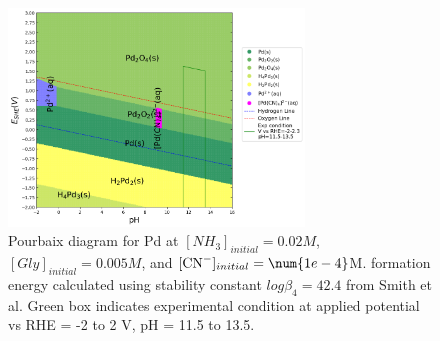 \documentclass[journal=jacsat,manuscript=article,email=false]{achemso}
\begin{document}

\begin{figure}[htbp]
    \centering
    \includegraphics[width=0.7\textwidth]{Figures/pourbaix_diagrams/Pd-NH3-H2O_activity_Smith1989CriticalConstants_Pd_42.4=1e-04_[NH3]=0.02M_[Gly]=0.005M_[CN]=0.0001.png}
    \caption{Pourbaix diagram for Pd at $[NH_3]_{initial}= 0.02M$, $[Gly]_{initial}=0.005M$, and $[\ce{CN-}]_{initial}=\num{1e-4}$M.  formation energy calculated using stability constant $log\beta_4=42.4$ from Smith et al.\cite{Smith1989CriticalConstants} Green box indicates experimental condition at applied potential vs RHE = -2 to 2 V, pH = 11.5 to 13.5.}
    \label{fig:Pd_Pourbaix_Smith1989CriticalConstants_SI}
\end{figure}
\end{document}
